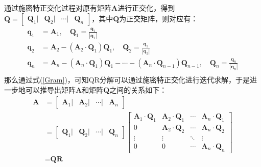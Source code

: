 通过施密特正交化过程对原有矩阵$\textbf{A}$进行正交化，得到$\textbf{Q} = \begin{bmatrix} \textbf{Q}_1 | & \textbf{Q}_2 | & \cdots | & \textbf{Q}_n \end{bmatrix}$，其中$\textbf{Q}$为正交矩阵，则对应有：
\begin{equation}\label{Gram}
	\begin{aligned}
		\textbf{q}_1 &= \textbf{A}_1,\quad \textbf{Q}_1 = \frac{\textbf{q}_1}{|\textbf{q}_1|} \\
		\textbf{q}_2 &= \textbf{A}_2-(\textbf{A}_2\cdot\textbf{Q}_1)\textbf{Q}_1,\quad \textbf{Q}_2 = \frac{\textbf{q}_2}{|\textbf{q}_2|} \\
		\textbf{q}_n &= \textbf{A}_n-(\textbf{A}_{n}\cdot\textbf{Q}_1)\textbf{Q}_1-\cdots-(\textbf{A}_{n}\cdot\textbf{Q}_{n-1})\textbf{Q}_{n-1},  \quad\textbf{Q}_n = \frac{\textbf{q}_n}{|\textbf{q}_n|} \\
	\end{aligned}
\end{equation}
那么通过式(\ref{Gram})，可知QR分解可以通过施密特正交化进行迭代求解，于是进一步地可以推导出矩阵$\textbf{A}$和矩阵$\textbf{Q}$之间的关系如下：
\begin{equation}
\begin{aligned}
\textbf{A} &= \begin{bmatrix} \textbf{A}_1 | & \textbf{A}_2 | & \cdots | & \textbf{A}_n \end{bmatrix} \\
& = \begin{bmatrix} \textbf{Q}_1 | & \textbf{Q}_2 | & \cdots | & \textbf{Q}_n \end{bmatrix}
\begin{bmatrix}\textbf{A}_1\cdot\textbf{Q}_1 &  \textbf{A}_2\cdot\textbf{Q}_1 & \cdots & \textbf{A}_n\cdot\textbf{Q}_1 \\
0 & \textbf{A}_2\cdot\textbf{Q}_2 & \cdots & \textbf{A}_n\cdot\textbf{Q}_2 \\
\vdots & \vdots & \ddots & \vdots \\
0& 0 & \cdots &\textbf{A}_n\cdot\textbf{Q}_n
\end{bmatrix}  \\
&= \textbf{Q}\textbf{R}
\end{aligned}
\end{equation}


